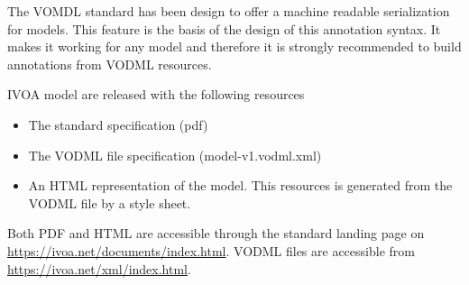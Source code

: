 The VOMDL standard has been design to offer a machine readable serialization for models. 
This feature is the basis of the design of this annotation syntax. 
It makes it working for any model
and therefore it is strongly recommended to build annotations from VODML resources.

IVOA model are released with the following resources
\begin{itemize}
    \item The standard specification (pdf)
    \item The VODML file specification (model-v1.vodml.xml)
    \item An HTML representation of the model. 
          This resources is generated from the VODML file by a style sheet.    
\end{itemize}

Both PDF and HTML are accessible through the standard landing page
on \url{https://ivoa.net/documents/index.html}.
VODML files are accessible from \url{https://ivoa.net/xml/index.html}.






